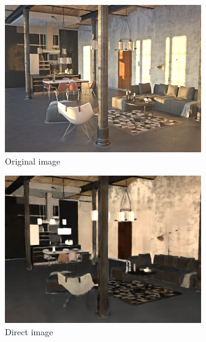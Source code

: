 \begin{figure}[H]
    \centering
    \begin{subfigure}{0.32\linewidth}
        \includegraphics[width=\linewidth]{praca/images/AI46_009_Cam06.png}
        \caption{Original image}
    \end{subfigure}
    \begin{subfigure}{0.32\linewidth}
        \includegraphics[width=\linewidth]{praca/images/AI46_009_Cam06.direct.png}
        \caption{Direct image}
    \end{subfigure}
    \begin{subfigure}{0.32\linewidth}

\end{subfigure}
\end{figure}
